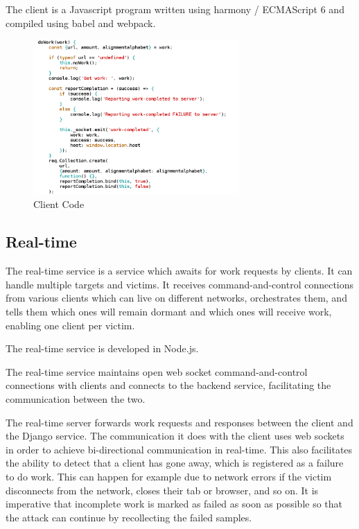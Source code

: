 The client is a Javascript program written using harmony / ECMAScript 6 and
compiled using babel and webpack.

\begin{figure}[H] \caption{Client Code} \centering
\includegraphics[width=0.7\textwidth]{diagrams/client.png}\end{figure}

\subsection{Real-time}

The real-time service is a service which awaits for work requests by clients.
It can handle multiple targets and victims. It receives command-and-control
connections from various clients which can live on different networks,
orchestrates them, and tells them which ones will remain dormant and which ones
will receive work, enabling one client per victim.

The real-time service is developed in Node.js.

The real-time service maintains open web socket command-and-control connections
with clients and connects to the backend service, facilitating the
communication between the two.

The real-time server forwards work requests and responses between the client
and the Django service. The communication it does with the client uses web
sockets in order to achieve bi-directional communication in real-time. This
also facilitates the ability to detect that a client has gone away, which is
registered as a failure to do work. This can happen for example due to network
errors if the victim disconnects from the network, closes their tab or browser,
and so on. It is imperative that incomplete work is marked as failed as soon as
possible so that the attack can continue by recollecting the failed samples.

